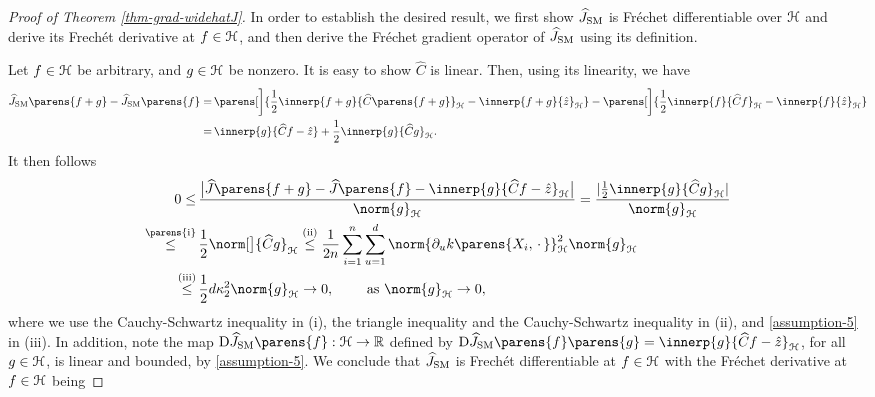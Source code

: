 \begin{proof}[Proof of Theorem \ref{thm-grad-widehatJ}]
	In order to establish the desired result, we first show $\widehat{J}_{\mathrm{SM}}$ is Fr{\'e}chet differentiable over $\mathcal{H}$ and derive its Frech{\'e}t derivative at $f \in \mathcal{H}$, and then derive the Fr{\'e}chet gradient operator of $\widehat{J}_{\mathrm{SM}}$ using its definition. 
	
	Let $f \in \mathcal{H}$ be arbitrary, and $g \in \mathcal{H}$ be nonzero. 
	It is easy to show $\widehat{C}$ is linear. Then, using its linearity, we have 
	\begin{align*}
		\widehat{J}_{\SM} \parens{f + g} - \widehat{J}_{\SM} \parens{f} 
		= & \, \parens[\bigg]{\frac{1}{2} \innerp{f + g}{\widehat{C} \parens{f + g}}_{\calH} - \innerp{f + g}{\hat{z}}_{\calH}} - \parens[\bigg]{\frac{1}{2} \innerp{f}{\widehat{C}f}_{\calH} - \innerp{f}{\hat{z}}_{\calH}} \\ 
		= & \, \innerp{g}{\widehat{C} f - \hat{z}} + \frac{1}{2} \innerp{g}{\widehat{C} g}_{\calH}. 
	\end{align*}
	It then follows 
	\begin{align*}
		0 \le & \, \frac{\abs[\big]{\widehat{J} \parens{f + g} - \widehat{J} \parens{f} - \innerp{g}{\widehat{C} f - \hat{z}}_{\calH}}}{\norm{g}_{\calH}} 
		= \frac{\abs{\frac{1}{2} \innerp{g}{\widehat{C} g}_{\calH}}}{\norm{g}_{\calH}} \\ 
		\stackrel{\mathrm{\parens{i}}}{\le} & \, \frac{1}{2} \norm[\big]{\widehat{C}g}_{\calH} 
		\stackrel{\text{(ii)}}{\le} \frac{1}{2n} \sum_{i=1}^n \sum_{u=1}^d \norm{\partial_u k \parens{X_i, \,\cdot\,}}_{\calH}^2 \norm{g}_{\calH} \\ 
		\stackrel{\text{(iii)}}{\le} & \, \frac{1}{2} d \kappa_2^2 \norm{g}_{\calH} \to 0, \qquad \text{ as } \norm{g}_{\calH} \to 0, 
	\end{align*}
	where we use the Cauchy-Schwartz inequality in (i), the triangle inequality and the Cauchy-Schwartz inequality in (ii), and \ref{assumption-5} in (iii). In addition, note the map $\Diff \widehat{J}_{\SM} \parens{f}: \calH \to \Real$ defined by $ \Diff \widehat{J}_{\SM} \parens{f} \parens{g} = \innerp{g}{\widehat{C}f - \hat{z}}_{\calH}$, for all $g \in \mathcal{H}$, is linear and bounded, by \ref{assumption-5}. We conclude that $\widehat{J}_{\mathrm{SM}}$ is Frech{\'e}t differentiable at $f \in \mathcal{H}$ with the Fr{\'e}chet derivative at $f \in \mathcal{H}$ being 

\end{proof}

